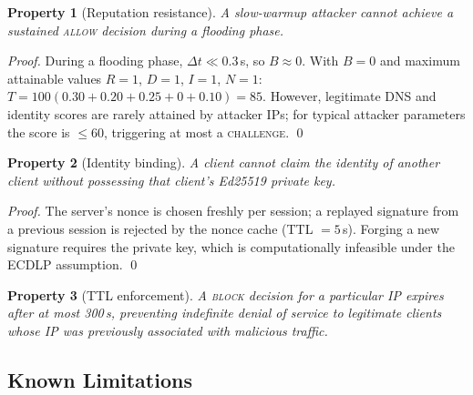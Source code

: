 \documentclass[10pt,conference]{IEEEtran}
\newtheorem{property}{Property}
\begin{document}
\begin{property}[Reputation resistance]
  A slow-warmup attacker cannot achieve a sustained \textsc{allow}
  decision during a flooding phase.
\end{property}

\begin{proof}
  During a flooding phase, $\Delta t \ll 0.3$\,s, so $B \approx 0$.
  With $B = 0$ and maximum attainable values $R = 1$, $D = 1$,
  $I = 1$, $N = 1$:
  $T = 100(0.30 + 0.20 + 0.25 + 0 + 0.10) = 85$.
  However, legitimate DNS and identity scores are rarely attained by
  attacker IPs; for typical attacker parameters the score is $\leq\!60$,
  triggering at most a \textsc{challenge}. \qed
\end{proof}

\begin{property}[Identity binding]
  A client cannot claim the identity of another client without
  possessing that client's Ed25519 private key.
\end{property}

\begin{proof}
  The server's nonce is chosen freshly per session; a replayed
  signature from a previous session is rejected by the nonce cache
  (TTL $= 5$\,s).  Forging a new signature requires the private key,
  which is computationally infeasible under the ECDLP assumption. \qed
\end{proof}

\begin{property}[TTL enforcement]
  A \textsc{block} decision for a particular IP expires after at most
  300\,s, preventing indefinite denial of service to legitimate clients
  whose IP was previously associated with malicious traffic.
\end{property}

\subsection{Known Limitations}
\label{sec:limitations}
\end{document}
